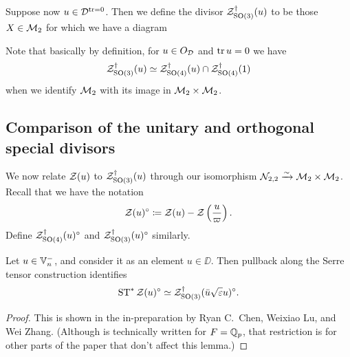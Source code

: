 \begin{definition}
  [$\ZO3(u)$]
  Suppose now $u \in \mathcal D^{\operatorname{tr} = 0}$.
  Then we define the divisor $\ZO3(u)$ to be those $X \in \mathcal M_2$
  for which we have a diagram
  \begin{center}
  \end{center}
  Note that basically by definition, for $u \in O_\mathcal D$ and $\operatorname{tr} u = 0$ we have
  \[ \mathcal Z^{\dagger}_{\operatorname{SO}(3)}(u) \simeq \mathcal Z^{\dagger}_{\operatorname{SO}(4)}(u) \cap \mathcal Z^{\dagger}_{\operatorname{SO}(4)}(1) \]
  when we identify $\mathcal M_2$ with its image in $\mathcal M_2 \times \mathcal M_2$.
\end{definition}

\subsection{Comparison of the unitary and orthogonal special divisors}
We now relate $\mathcal Z(u)$ to $\ZO3(u)$ through our
isomorphism $\mathcal N_{2,2} \xrightarrow{\sim} \mathcal M_2 \times \mathcal M_2$.
Recall that we have the notation
\[ \mathcal Z(u)^\circ \coloneqq \mathcal Z(u) - \mathcal Z\left( \frac{u}{\varpi} \right). \]
Define $\mathcal Z^{\dagger}_{\operatorname{SO}(4)}(u)^\circ$ and $\mathcal Z^{\dagger}_{\operatorname{SO}(3)}(u)^\circ$ similarly.

\begin{lemma}
  \label{lem:serre_pullback_divisor}
  Let $u \in \mathbb V_n^-$, and consider it as an element $u \in \DD$.
  Then pullback along the Serre tensor construction identifies
  \[ \operatorname{ST}^\ast \mathcal Z(u)^\circ \simeq \mathcal Z^{\dagger}_{\operatorname{SO}(3)}(\bar u \sqrt{\varepsilon} u)^\circ. \]
\end{lemma}
\begin{proof}
  This is shown in the in-preparation
  \cite{ref:CLZ} by Ryan C.~Chen, Weixiao Lu, and Wei Zhang.
  (Although \cite{ref:CLZ} is technically written for $F = \mathbb Q_p$,
  that restriction is for other parts of the paper that don't affect this lemma.)
\end{proof}

